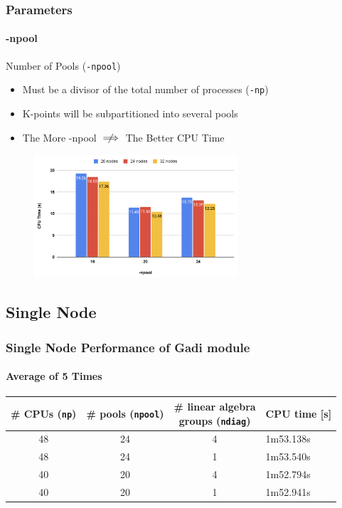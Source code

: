 \documentclass{beamer}
\begin{document}
\begin{frame}
    \frametitle{Parameters}
    \framesubtitle{\ttfamily -npool}
    \begin{alertblock}{Number of Pools (\texttt{-npool})}
    \begin{itemize}
        \item Must be a divisor of the total number of processes (\texttt{-np})
        \item K-points will be subpartitioned into several pools
        \item The More -npool $\centernot\implies$ The Better CPU Time
    \end{itemize}
    \end{alertblock}
    \begin{figure}
        \includegraphics[width=.75\linewidth, height=130pt]{npool}
    \end{figure}

\end{frame}

\subsection{Single Node}

\begin{frame}
	\frametitle{Single Node Performance of Gadi module}
	\framesubtitle{Average of 5 Times}
    \begin{table}
        \centering
        \begin{tabular}{cccl}
           \# CPUs (\texttt{np})  & \# pools (\texttt{npool}) & \makecell{\# linear algebra\\ groups (\texttt{ndiag})} & CPU time [s] \\
            \hline
            48 & 24 & 4 & 1m53.138s \\
            48 & 24 & 1 & 1m53.540s \\
            40 & 20 & 4 & 1m52.794s \\
            40 & 20 & 1 & 1m52.941s \\
        \end{tabular}
        \label{tab:qe-single-module}
    \end{table}
\end{frame}
\end{document}
